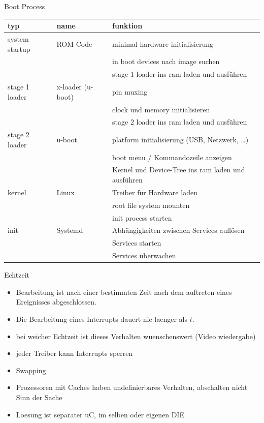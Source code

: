 

\begin{frame}{Boot Process \cite{OMAPBootloaderOverview}}
	\begin{tabular}{|l|l|l|}
		\hline typ & name & funktion \\ 
		\hline system startup & ROM Code & minimal hardware initialisierung \\ 
		& & in boot devices nach image suchen \\
		& & stage 1 loader ins ram laden und ausführen \\
		
		\hline stage 1 loader & x-loader (u-boot) & pin muxing \\ 
		& & clock und memory initialisieren \\
		& & stage 2 loader ins ram laden und ausführen \\
		
		\hline stage 2 loader & u-boot & platform initialisierung (USB, Netzwerk, \ldots) \\
		& & boot menu / Kommandozeile anzeigen \\
		& & Kernel und Device-Tree ins ram laden und ausführen \\
		
		\hline kernel & Linux & Treiber für Hardware laden \\ 
		& & root file system mounten \\
		& & init process starten \\
		
		\hline init & Systemd & Abhängigkeiten zwischen Services auflösen \\ 
		& & Services starten \\
		& & Services überwachen \\
		
		\hline 
	\end{tabular} 
\end{frame}


\begin{frame}{Echtzeit}
	\begin{itemize}
		\item Bearbeitung ist nach einer bestimmten Zeit nach dem auftreten eines Ereignisses abgeschlossen.
		\item Die Bearbeitung eines Interrupts dauert nie laenger als $t$.
		\item bei weicher Echtzeit ist dieses Verhalten wuenschenswert (Video wiedergabe)
		\item jeder Treiber kann Interrupts sperren
		\item Swapping
		\item Prozessoren mit Caches haben undefinierbares Verhalten, abschalten nicht Sinn der Sache
		\item Loesung ist separater uC, im selben oder eigenen DIE
	\end{itemize}
\end{frame}


